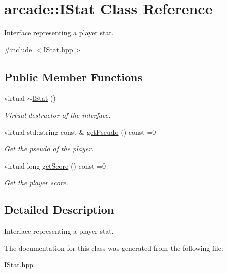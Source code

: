 \hypertarget{classarcade_1_1IStat}{}\section{arcade\+:\+:I\+Stat Class Reference}
\label{classarcade_1_1IStat}


Interface representing a player stat.  




{\ttfamily \#include $<$I\+Stat.\+hpp$>$}

\subsection*{Public Member Functions}
\begin{DoxyCompactItemize}
\item 
\mbox{\label{classarcade_1_1IStat_af8996c563dee5095d30592647fd0f00c}} 
virtual \hyperlink{classarcade_1_1IStat_af8996c563dee5095d30592647fd0f00c}{$\sim$\+I\+Stat} ()
\begin{DoxyCompactList}\small\item\em Virtual destructor of the interface. \end{DoxyCompactList}\item 
\mbox{\label{classarcade_1_1IStat_a6418289d2ae6b3d477ab8a9629487f18}} 
virtual std\+::string const  \& \hyperlink{classarcade_1_1IStat_a6418289d2ae6b3d477ab8a9629487f18}{get\+Pseudo} () const =0
\begin{DoxyCompactList}\small\item\em Get the pseudo of the player. \end{DoxyCompactList}\item 
\mbox{\label{classarcade_1_1IStat_acda674f38783f8d12db43103655642b7}} 
virtual long \hyperlink{classarcade_1_1IStat_acda674f38783f8d12db43103655642b7}{get\+Score} () const =0
\begin{DoxyCompactList}\small\item\em Get the player score. \end{DoxyCompactList}\end{DoxyCompactItemize}


\subsection{Detailed Description}
Interface representing a player stat. 

The documentation for this class was generated from the following file\+:\begin{DoxyCompactItemize}
\item 
I\+Stat.\+hpp\end{DoxyCompactItemize}
